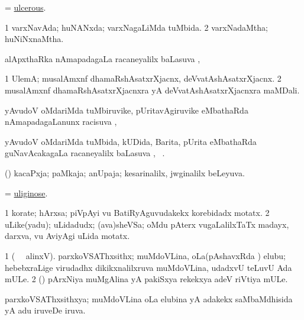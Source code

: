 \bentry
{} 
\gl{\gu}
\expl{}
\bmng
= \hyperlink{ulcerous}{ulcerous}. 
\emng
\eentry

\bentry
{} 
\gl{\gu}
\expl{}
\bmng
\bnum
\num{1} varxNavAda; huNANxda; varxNagaLiMda tuMbida. 
\num{2} varxNadaMtha; huNiNxnaMtha. 
\enum
\emng
\eentry

\bentry
{}
\gl{\uparx}
\expl{}
\bmng
alApxthaRka nAmapadagaLa racaneyalilx baLasuva \uparx, \udA\  
\emng
\eentry

\bentry
{} 
\gl{\nA}
\expl{}
\bmng
\bnum
\num{1} UlemA; musalAmxnf dhamaRshAsatxrXjacnx, deVvatAshAsatxrXjacnx. 
\num{2} musalAmxnf dhamaRshAsatxrXjacnxra yA deVvatAshAsatxrXjacnxra maMDali. 
\enum
\emng
\eentry

\bentry
{}
\gl{\uparx}
\expl{}
\bmng
yAvudoV oMdariMda tuMbiruvike, pUritavAgiruvike eMbathaRda nAmapadagaLanunx racisuva \uparx, \udA\  
\emng
\eentry

\bentry
{} 
\gl{\uparx}
\expl{}
\bmng
yAvudoV oMdariMda tuMbida, kUDida, Barita, pUrita eMbathaRda guNavAcakagaLa racaneyalilx baLasuva \uparx, \udA\ . 
\emng
\eentry

\bentry
{} 
\gl{\gu}
\expl{}
\bmng
(\savi) kacaPxja; paMkaja; anUpaja; kesarinalilx, jwginalilx beLeyuva. 
\emng
\eentry

\bentry
{} 
\gl{\gu}
\expl{}
\bmng
= \hyperlink{uliginose}{uliginose}. 
\emng
\eentry

\bentry
{} 
\gl{\nA}
\expl{}
\bmng
\bnum
\num{1} korate; hArxsa; piVpAyi \mo vu BatiRyAguvudakekx korebidadx motatx. 
\num{2} uLike(yadu); uLidadudx; (ava)sheVSa; oMdu pAterx \mo vugaLalilxTaTx madayx, darxva, \mo vu AviyAgi uLida motatx. 
\enum
\emng
\eentry

\bentry
{} 
\gl{\nA}
\bmng
\bnum
\num{1} (\bava\  \ucAcx\ alinxV). parxkoVSAThxsithx; muMdoVLina, oLa(pAshavxRda ) elubu; hebebxraLige virudadhx dikikxnalilxruva muMdoVLina, udadxvU teLuvU Ada mULe. 
\num{2} (\pArxvi) pArxNiya muMgAlina yA pakiSxya rekekxya adeV riVtiya mULe. 
\enum
\emng
\eentry

\bentry
{} 
\gl{\gu}
\expl{}
\bmng
parxkoVSAThxsithxya; muMdoVLina oLa elubina yA adakekx saMbaMdhisida yA adu iruveDe iruva. 
\emng
\eentry


